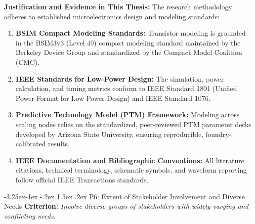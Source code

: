 \documentclass[12pt,a4paper,oneside]{report}
\makeatletter
\renewcommand\subsubsection{\@startsection{subsubsection}{3}{\z@}%
                                     {-3.25ex\@plus -1ex \@minus -.2ex}%
                                     {1.5ex \@plus .2ex}%
                                     {\normalfont\normalsize\itshape}}
\makeatother
\begin{document}
\noindent\textbf{Justification and Evidence in This Thesis:}
The research methodology adheres to established microelectronics design and modeling standards:
\begin{enumerate}
\item \textbf{BSIM Compact Modeling Standards:} Transistor modeling is grounded in the BSIM3v3 (Level 49) compact modeling standard maintained by the Berkeley Device Group and standardized by the Compact Model Coalition (CMC).
\item \textbf{IEEE Standards for Low-Power Design:} The simulation, power calculation, and timing metrics conform to IEEE Standard 1801 (Unified Power Format for Low Power Design) and IEEE Standard 1076.
\item \textbf{Predictive Technology Model (PTM) Framework:} Modeling across scaling nodes relies on the standardized, peer-reviewed PTM parameter decks developed by Arizona State University, ensuring reproducible, foundry-calibrated results.
\item \textbf{IEEE Documentation and Bibliographic Conventions:} All literature citations, technical terminology, schematic symbols, and waveform reporting follow official IEEE Transactions standards.
\end{enumerate}

\subsubsection{P6: Extent of Stakeholder Involvement and Diverse Needs}
\textbf{Criterion:} \textit{Involve diverse groups of stakeholders with widely varying and conflicting needs.}
\end{document}
